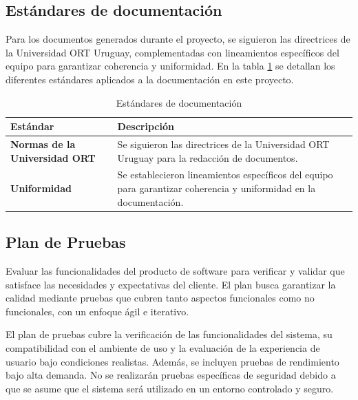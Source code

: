 \subsection{Estándares de documentación}

Para los documentos generados durante el proyecto, se siguieron las directrices de la Universidad ORT Uruguay, 
complementadas con lineamientos específicos del equipo para garantizar coherencia y uniformidad.
En la tabla \ref{tab:estandaresDocumentacion} se detallan los diferentes estándares aplicados a la documentación en este proyecto.


\begin{table}[H]
    \centering
    \begin{tabular}{p{3cm} p{10cm}}
    \hline
    \rowcolor[HTML]{C0C0C0} 
    \textbf{Estándar} & \textbf{Descripción}                                                                                     \\ \hline
    \textbf{Normas de la Universidad ORT} & Se siguieron las directrices de la Universidad ORT Uruguay para la redacción de documentos. \\ \hline
    \textbf{Uniformidad}     & Se establecieron lineamientos específicos del equipo para garantizar coherencia y uniformidad en la documentación.       \\ \hline
    \end{tabular}
    \caption{Estándares de documentación}
    \label{tab:estandaresDocumentacion}
\end{table}

\subsection{Plan de Pruebas}

Evaluar las funcionalidades del producto de software para verificar y validar que satisface las necesidades y expectativas del cliente. El plan 
busca garantizar la calidad mediante pruebas que cubren tanto aspectos funcionales como no funcionales, con un enfoque ágil e iterativo.

El plan de pruebas cubre la verificación de las funcionalidades del sistema, su compatibilidad con el ambiente de uso y la evaluación de la 
experiencia de usuario bajo condiciones realistas. Además, se incluyen pruebas de rendimiento bajo alta demanda. No se realizarán pruebas 
específicas de seguridad debido a que se asume que el sistema será utilizado en un entorno controlado y seguro.

